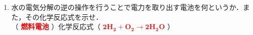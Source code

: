 \begin{enumerate}
\begin{enumerate}
        \item 使うと電圧が下がるが，外部から逆向きの電流をかけることで電圧が回復し，再び使用可能となる電池を何というか．またその例を1つかけ．\\
        （ \textcolor{red}{\textbf{二次電池}} ）\hspace{1cm}例（ \textcolor{red}{\textbf{鉛蓄電池（またはリチウムイオン電池など）}} ）
    \end{enumerate}
    \item 水の電気分解の逆の操作を行うことで電力を取り出す電池を何というか．また，その化学反応式を示せ．\\
    （ \textcolor{red}{\textbf{燃料電池}} ）\hspace{1cm}化学反応式（ \textcolor{red}{$\mathbf{2H_2 + O_2 \rightarrow 2H_2O}$} ）
\end{enumerate}
